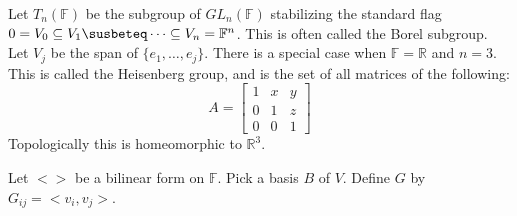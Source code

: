 \documentclass[crop=false,class=book,oneside]{standalone}                      %
\begin{document}
        \begin{example}
            Let $T_{n}(\mathbb{F})$ be the subgroup of $GL_{n}(\mathbb{F})$
            stabilizing the standard flag
            $0=V_{0}\subseteq{V}_{1}\susbeteq\dots\subseteq{V}_{n}=\mathbb{F}^{n}$. This is often called the Borel subgroup. Let $V_{j}$ be
            the span of $\{e_{1},\dots,e_{j}\}$. There is a special case when
            $\mathbb{F}=\mathbb{R}$ and $n=3$. This is called the
            Heisenberg group, and is the set of all matrices of the following:
            \begin{equation}
                A=\begin{bmatrix}
                    1&x&y\\
                    0&1&z\\
                    0&0&1
                \end{bmatrix}
            \end{equation}
            Topologically this is homeomorphic to $\mathbb{R}^{3}$.
        \end{example}
        Let $<>$ be a bilinear form on $\mathbb{F}$. Pick a basis $B$ of $V$.
        Define $G$ by $G_{ij}=<v_{i},v_{j}>$.
\end{document}
